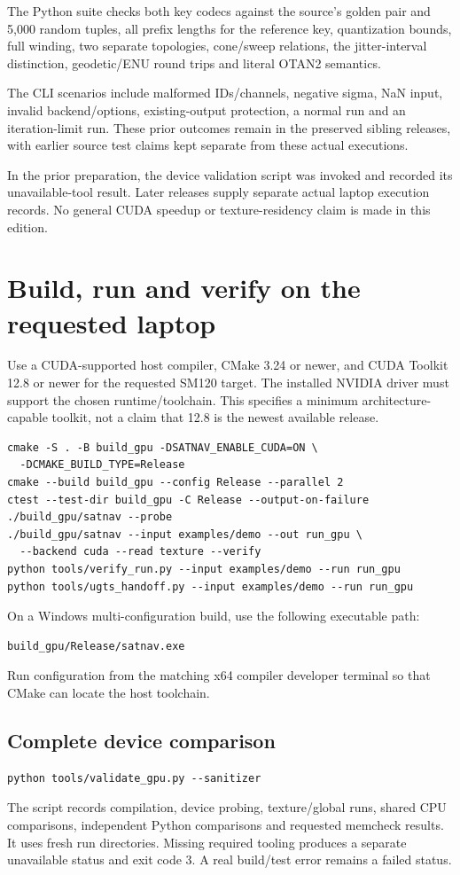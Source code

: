 The Python suite checks both key codecs against the source's golden pair and 5,000
random tuples, all prefix lengths for the reference key, quantization bounds, full
winding, two separate topologies, cone/sweep relations, the jitter-interval distinction,
geodetic/ENU round trips and literal OTAN2 semantics.

The CLI scenarios include malformed IDs/channels, negative sigma, NaN input, invalid
backend/options, existing-output protection, a normal run and an iteration-limit run.
These prior outcomes remain in the preserved sibling releases, with earlier source test claims
kept separate from these actual executions.

In the prior preparation, the device validation script was invoked and recorded
its unavailable-tool result. Later releases supply separate actual laptop execution records. No general CUDA speedup or texture-residency claim is made
in this edition.
\clearpage

\section{Build, run and verify on the requested laptop}
Use a CUDA-supported host compiler, CMake 3.24 or newer, and CUDA Toolkit 12.8 or newer
for the requested SM120 target. The installed NVIDIA driver must support the chosen
runtime/toolchain. This specifies a minimum architecture-capable toolkit, not a claim
that 12.8 is the newest available release. 

\begin{lstlisting}
cmake -S . -B build_gpu -DSATNAV_ENABLE_CUDA=ON \
  -DCMAKE_BUILD_TYPE=Release
cmake --build build_gpu --config Release --parallel 2
ctest --test-dir build_gpu -C Release --output-on-failure
./build_gpu/satnav --probe
./build_gpu/satnav --input examples/demo --out run_gpu \
  --backend cuda --read texture --verify
python tools/verify_run.py --input examples/demo --run run_gpu
python tools/ugts_handoff.py --input examples/demo --run run_gpu
\end{lstlisting}
On a Windows multi-configuration build, use the following executable path:
\begin{lstlisting}
build_gpu/Release/satnav.exe
\end{lstlisting}
Run configuration from the matching x64 compiler developer terminal so that CMake can locate the host toolchain.

\subsection{Complete device comparison}
\begin{lstlisting}
python tools/validate_gpu.py --sanitizer
\end{lstlisting}
The script records compilation, device probing, texture/global runs, shared CPU
comparisons, independent Python comparisons and requested memcheck results. It
uses fresh run directories. Missing required tooling produces a separate unavailable
status and exit code 3. A real build/test error remains a failed status.

